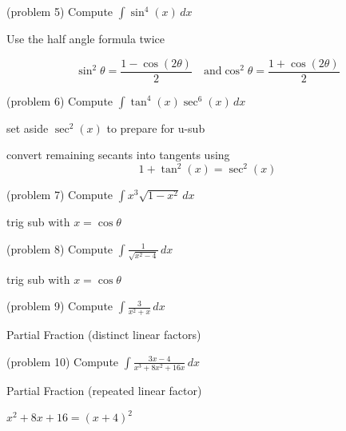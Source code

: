 \documentclass[handout]{ximera}
\begin{document}
\begin{problem}(problem 5)
Compute $\displaystyle \int \sin^4(x) \, dx$

\begin{hint}
Use the half angle formula twice

\[
\sin^2 \theta = \frac{1-\cos(2\theta)}{2} \quad \mbox{and}  \cos^2 \theta = \frac{1+\cos(2\theta)}{2}
\]
\end{hint}

\end{problem}

\begin{problem}(problem 6)
Compute $\displaystyle \int \tan^4(x) \sec^6(x) \, dx$

\begin{hint}
set aside $\sec^2(x)$ to prepare for u-sub
\end{hint}

\begin{hint}
convert remaining secants into tangents using
\[
1+ \tan^2(x) = \sec^2(x)
\]

\end{hint}
\end{problem}

\begin{problem}(problem 7)
Compute $\displaystyle \int x^3 \sqrt{1-x^2} \, dx$
\begin{hint}
trig sub with $x= \cos \theta$
\end{hint}

\end{problem}

\begin{problem}(problem 8)
Compute $\displaystyle \int \frac{1}{ \sqrt{x^2 - 4}} \, dx$
\begin{hint}
trig sub with $x= \cos \theta$
\end{hint}
\end{problem}


\begin{problem}(problem 9)
Compute $\displaystyle \int \frac{3}{x^2 + x} \, dx$
\begin{hint}
Partial Fraction (distinct linear factors)
\end{hint}
\end{problem}

\begin{problem}(problem 10)
Compute $\displaystyle \int \frac{3x-4}{x^3 +8x^2 +16x} \, dx$
\begin{hint}
Partial Fraction (repeated linear factor)
\end{hint}

\begin{hint}
$x^2 + 8x + 16 = (x+4)^2$
\end{hint}

\end{problem}
\end{document}
